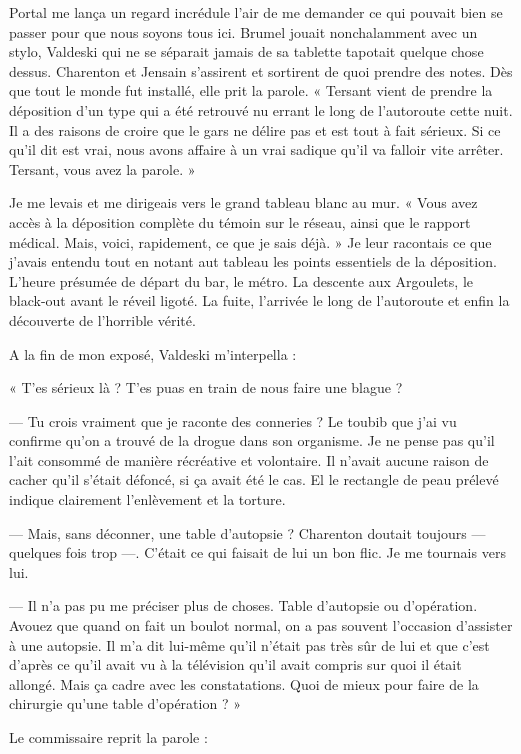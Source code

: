 Portal me lança un regard incrédule l'air de me demander ce qui pouvait bien se passer pour que nous soyons tous ici.
Brumel jouait nonchalamment avec un stylo, Valdeski qui ne se séparait jamais de sa tablette tapotait quelque chose
dessus. Charenton et Jensain s'assirent et sortirent de quoi prendre des notes. Dès que tout le monde fut installé, 
elle prit la parole. « Tersant vient de prendre la déposition d'un type qui a été retrouvé nu errant le long de 
l'autoroute cette nuit. Il a des raisons de croire que le gars ne délire pas et est tout à fait sérieux. Si ce qu'il 
dit est vrai, nous avons affaire à un vrai sadique qu'il va falloir vite arrêter. Tersant, vous avez la parole. »

Je me levais et me dirigeais vers le grand tableau blanc au mur. « Vous avez accès à la déposition complète du témoin 
sur le réseau, ainsi que le rapport médical. Mais, voici, rapidement, ce que je sais déjà.  » Je leur racontais ce que 
j'avais entendu tout en notant aut tableau les points essentiels de la déposition. L'heure présumée de départ du bar, 
le métro. La descente aux Argoulets, le black-out avant le réveil ligoté. La fuite, l'arrivée le long de l'autoroute et 
enfin la découverte de l'horrible vérité.

A la fin de mon exposé, Valdeski m'interpella :

« T'es sérieux là ? T'es puas en train de nous faire une blague ?

— Tu crois vraiment que je raconte des conneries ? Le toubib que j'ai vu confirme qu'on a trouvé de la drogue dans son 
organisme. Je ne pense pas qu'il l'ait consommé de manière récréative et volontaire. Il n'avait aucune raison de  cacher 
qu'il s'était défoncé, si ça avait été le cas. El le rectangle de peau prélevé indique clairement l'enlèvement et la 
torture.

— Mais, sans déconner, une table d'autopsie ? Charenton doutait toujours — quelques fois trop —. C'était ce qui faisait 
de lui un bon flic. Je me tournais vers lui.

— Il n'a pas pu me préciser plus de choses. Table d'autopsie ou d'opération. Avouez que quand on fait un boulot 
normal, on a pas souvent l'occasion d'assister à une autopsie. Il m'a dit lui-même qu'il n'était pas très sûr de lui 
et que c'est d'après ce qu'il avait vu à la télévision qu'il avait compris sur quoi il était allongé. Mais ça cadre 
avec les constatations. Quoi de mieux pour faire de la chirurgie qu'une table d'opération ? »

Le commissaire reprit la parole :

